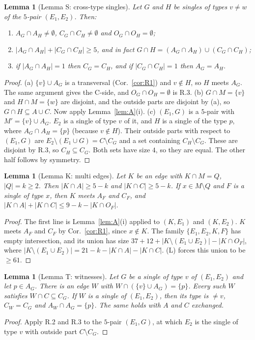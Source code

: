 \documentclass[11pt]{amsart}
\newtheorem{lemma}[theorem]{Lemma}
\theoremstyle{definition}
\begin{document}
\begin{lemma}[Lemma S: cross-type singles]\label{lem:S}
Let $G$ and $H$ be singles of types $v\ne w$ of the $5$-pair $(E_1,E_2)$. Then:
\begin{enumerate}[label=\textup{(\alph*)}]
\item $A_G\cap A_H\ne\emptyset$, $C_G\cap C_H\ne\emptyset$ and $O_G\cap O_H=\emptyset$;
\item $|A_G\cap A_H|+|C_G\cap C_H|\ge 5$, and in fact $G\cap H=(A_G\cap A_H)\cup(C_G\cap C_H)$;
\item if $|A_G\cap A_H|=1$ then $C_G=C_H$, and if $|C_G\cap C_H|=1$ then $A_G=A_H$.
\end{enumerate}
\end{lemma}
\begin{proof}
(a) $\{v\}\cup A_G$ is a transversal (Cor.~\ref{cor:R1}) and $v\notin H$, so $H$ meets $A_G$. The same argument gives the C-side, and $O_G\cap O_H=\emptyset$ is R.3.
(b) $G\cap M=\{v\}$ and $H\cap M=\{w\}$ are disjoint, and the outside parts are disjoint by (a), so $G\cap H\subseteq A\cup C$. Now apply Lemma~\ref{lem:A}(i).
(c) $(E_1,G)$ is a $5$-pair with $M'=\{v\}\cup A_G$. $E_2$ is a single of type $v$ of it, and $H$ is a single of the type $p$, where $A_G\cap A_H=\{p\}$ (because $v\notin H$). Their outside parts with respect to $(E_1,G)$ are $E_2\setminus(E_1\cup G)=C\setminus C_G$ and a set containing $C_H\setminus C_G$. These are disjoint by R.3, so $C_H\subseteq C_G$. Both sets have size $4$, so they are equal. The other half follows by symmetry.
\end{proof}

\begin{lemma}[Lemma K: multi edges]\label{lem:K}
Let $K$ be an edge with $K\cap M=Q$, $|Q|=k\ge 2$. Then $|K\cap A|\ge 5-k$ and $|K\cap C|\ge 5-k$. If $x\in M\setminus Q$ and $F$ is a single of type $x$, then $K$ meets $A_F$ and $C_F$, and $|K\cap A|+|K\cap C|\le 9-k-|K\cap O_F|$.
\end{lemma}
\begin{proof}
The first line is Lemma~\ref{lem:A}(i) applied to $(K,E_1)$ and $(K,E_2)$. $K$ meets $A_F$ and $C_F$ by Cor.~\ref{cor:R1}, since $x\notin K$. The family $\{E_1,E_2,K,F\}$ has empty intersection, and its union has size $37+12+|K\setminus(E_1\cup E_2)|-|K\cap O_F|$, where $|K\setminus(E_1\cup E_2)|=21-k-|K\cap A|-|K\cap C|$. (L) forces this union to be $\ge 61$.
\end{proof}

\begin{lemma}[Lemma T: witnesses]\label{lem:T}
Let $G$ be a single of type $v$ of $(E_1,E_2)$ and let $p\in A_G$. There is an edge $W$ with $W\cap(\{v\}\cup A_G)=\{p\}$. Every such $W$ satisfies $W\cap C\subseteq C_G$. If $W$ is a single of $(E_1,E_2)$, then its type is $\ne v$, $C_W=C_G$ and $A_W\cap A_G=\{p\}$. The same holds with $A$ and $C$ exchanged.
\end{lemma}
\begin{proof}
Apply R.2 and R.3 to the $5$-pair $(E_1,G)$, at which $E_2$ is the single of type $v$ with outside part $C\setminus C_G$.
\end{proof}
\end{document}
